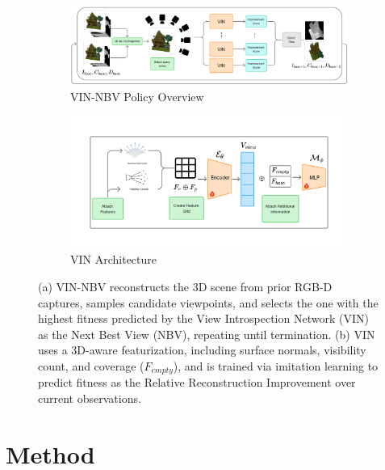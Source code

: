 \begin{figure}[!t]
  \centering
  \begin{subfigure}[b]{0.6\linewidth}
    \centering
    \includegraphics[width=\linewidth]{Figures/VIN-NBV_diagram.png}
    \caption{VIN-NBV Policy Overview}
    \label{fig:arch_left}
  \end{subfigure}
  \hfill
  \begin{subfigure}[b]{0.39\linewidth}
    \centering
    \includegraphics[width=\linewidth]{Figures/VIN_arch.png}
    \caption{VIN Architecture}
    \label{fig:arch_right}
  \end{subfigure}
  \vspace{-0.5em}
  \caption{
(a) VIN-NBV reconstructs the 3D scene from prior RGB-D captures, samples candidate viewpoints, and selects the one with the highest fitness predicted by the View Introspection Network (VIN) as the Next Best View (NBV), repeating until termination.
(b) VIN uses a 3D-aware featurization, including surface normals, visibility count, and coverage ($F_{empty}$), and is trained via imitation learning to predict fitness as the Relative Reconstruction Improvement over current observations.
}
  \label{fig:method_nbv_diagram}
  \vspace{-1.2em}
\end{figure}

\section{Method}
\label{sec:method}
\vspace{-0.25em}

